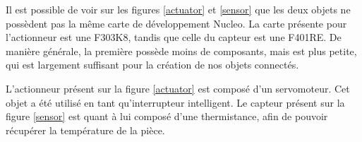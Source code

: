 Il est possible de voir sur les figures \ref{actuator} et \ref{sensor} que les deux objets ne possèdent pas la 
même carte de développement Nucleo. La carte présente pour l'actionneur est une F303K8, tandis que celle du 
capteur est une F401RE. De manière générale, la première possède moins de composants, mais est plus petite, 
qui est largement suffisant pour la création de nos objets connectés.

L'actionneur présent sur la figure \ref{actuator} est composé d'un servomoteur. Cet objet a été utilisé en 
tant qu'interrupteur intelligent. Le capteur présent sur la figure \ref{sensor} est quant à lui composé d'une 
thermistance, afin de pouvoir récupérer la température de la pièce.




